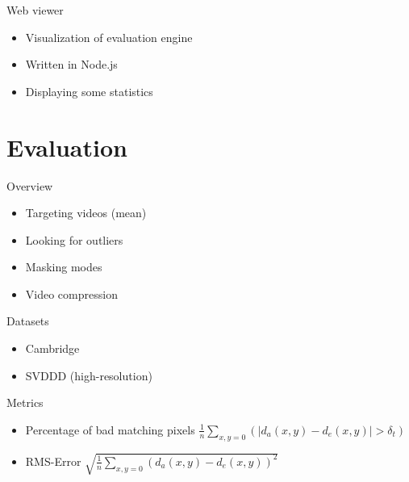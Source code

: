 \documentclass[10pt]{beamer}
\begin{document}
\begin{frame}[fragile]{Web viewer}
  \begin{itemize}
    \item Visualization of evaluation engine
    \item Written in Node.js
    \item Displaying some statistics
  \end{itemize}
\end{frame}


\section{Evaluation}

\begin{frame}[fragile]{Overview}
  \begin{itemize}
    \item Targeting videos (mean)
    \item Looking for outliers
    \item Masking modes
    \item Video compression
  \end{itemize}
\end{frame}

\begin{frame}[fragile]{Datasets}
  \begin{itemize}
    \item Cambridge
    \item SVDDD (high-resolution)
  \end{itemize}
\end{frame}

\begin{frame}[fragile]{Metrics}
  \begin{itemize}
    \item \begin{block}{Percentage of bad matching pixels}
      $\frac{1}{n} \sum_{x,y=0}^{}(|d_a(x,y) - d_e(x,y)| > \delta_t)$
    \end{block}
    \item \begin{block}{RMS-Error}
      $\sqrt{\frac{1}{n} \sum_{x,y=0}^{}(d_a(x,y) - d_e(x,y))^2}$
    \end{block}
  \end{itemize}
\end{frame}
\end{document}
